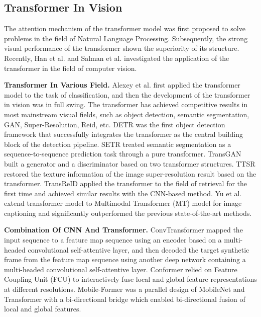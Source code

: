 \documentclass[lettersize,journal]{IEEEtran}
\begin{document}
\subsection{Transformer In Vision}
The attention mechanism \cite{ref41} of the transformer model was first proposed to solve problems in the field of Natural Language Processing. Subsequently, the strong visual performance of the transformer shown the superiority of its structure. Recently, Han et al. \cite{ref42} and Salman et al. \cite{ref43} investigated the application of the transformer in the field of computer vision. 

\textbf{Transformer In Various Field.} Alexey et al. \cite{ref15} first applied the transformer model to the task of classification, and then the development of the transformer in vision was in full swing. The transformer has achieved competitive results in most mainstream visual fields, such as object detection, semantic segmentation, GAN, Super-Resolution, Reid, etc. DETR \cite{ref44} was the first object detection framework that successfully integrates the transformer as the central building block of the detection pipeline. SETR \cite{ref45} treated semantic segmentation as a sequence-to-sequence prediction task through a pure transformer. TransGAN \cite{ref46} built a generator and a discriminator based on two transformer structures. TTSR \cite{ref47} restored the texture information of the image super-resolution result based on the transformer. TransReID \cite{ref23} applied the transformer to the field of retrieval for the first time and achieved similar results with the CNN-based method. Yu et al. \cite{ref59} extend transformer model to Multimodal Transformer (MT) model for image captioning and significantly outperformed the previous state-of-the-art methods. 

\textbf{Combination Of CNN And Transformer.} ConvTransformer\cite{ref54} mapped the input sequence to a feature map sequence using an encoder based on a multi-headed convolutional self-attentive layer, and then decoded the target synthetic frame from the feature map sequence using another deep network containing a multi-headed convolutional self-attentive layer. Conformer \cite{ref55} relied on Feature Coupling Unit (FCU) to interactively fuse local and global feature representations at different resolutions. Mobile-Former \cite{ref56} was a parallel design of MobileNet and Transformer with a bi-directional bridge which enabled bi-directional fusion of local and global features.
\end{document}
